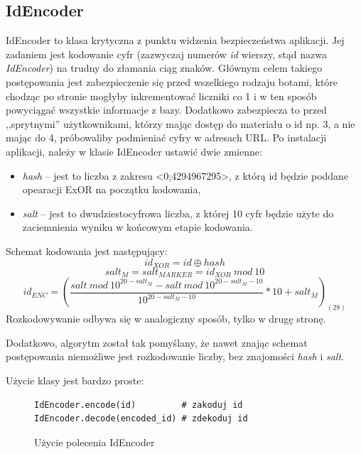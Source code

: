 \documentclass[a4paper,12pt,oneside]{report}
\begin{document}
\subsection{IdEncoder}
\label{sub:idencoder}
  IdEncoder to klasa krytyczna z punktu widzenia bezpieczeństwa aplikacji. Jej zadaniem jest kodowanie cyfr (zazwyczaj numerów \emph{id} wierszy, stąd nazwa \emph{IdEncoder}) na trudny do złamania ciąg znaków. Głównym celem takiego postępowania jest zabezpieczenie się przed wszelkiego rodzaju botami, które chodząc po stronie mogłyby inkrementować liczniki co 1 i w ten sposób powyciągać wszystkie informacje z bazy. Dodatkowo zabezpiecza to przed ,,sprytnymi'' użytkownikami, którzy mając dostęp do materiału o id np. 3, a nie mając do 4, próbowaliby podmieniać cyfry w adresach URL. Po instalacji aplikacji, należy w klasie IdEncoder ustawić dwie zmienne:
\begin{itemize}
  \item \emph{hash} -- jest to liczba z zakresu <0;4294967295>, z którą id będzie poddane opearacji ExOR na początku kodowania,
  \item \emph{salt} -- jest to dwudziestocyfrowa liczba, z której 10 cyfr będzie użyte do zaciemnienia wyniku w końcowym etapie kodowania.
\end{itemize}
Schemat kodowania jest następujący:
\begin{equation}
  id_{XOR} = id \oplus hash
\end{equation}
\begin{equation}
  salt_{M} = salt_{MARKER} = id_{XOR}~mod~10
\end{equation}
\begin{equation}
  id_{ENC} = \left(\frac{salt~mod~10^{20 - salt_{M}} - salt~mod~10^{20 - salt_{M} - 10}}{10^{20 - salt_{M} - 10}} * 10 + salt_{M}\right)_{(28)}
  \label{equ:idenc}
\end{equation}
Rozkodowywanie odbywa się w analogiczny sposób, tylko w drugę stronę.

Dodatkowo, algorytm został tak pomyślany, że nawet znając schemat postępowania niemożliwe jest rozkodowanie liczby, bez znajomości \emph{hash} i \emph{salt}.

Użycie klasy jest bardzo proste:
\begin{figure}[h]
\begin{verbatim}IdEncoder.encode(id)         # zakoduj id
IdEncoder.decode(encoded_id) # zdekoduj id\end{verbatim}
\caption{Użycie polecenia IdEncoder\label{fig:idenc}}
\end{figure}
\end{document}
